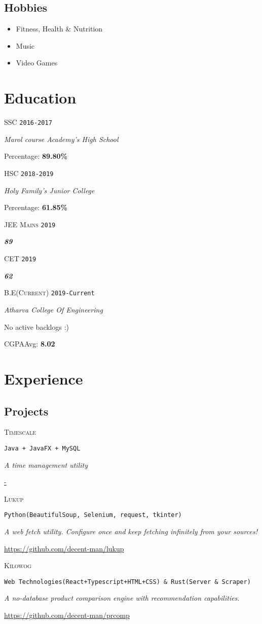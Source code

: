 \documentclass{article}
\newcommand{\school}{Marol course Academy's High School}
\newcommand{\hischool}{Holy Family's Junior College}
\newcommand{\college}{Atharva College Of Engineering}
\newcommand{\course}[6]{
	\begin{minipage}[t]{.15\textwidth}
		\hfill \large \textsc{#1}\hspace{1cm}\linebreak[4]
		\vspace{1cm}
		\hfill \footnotesize \texttt{#2}
	\end{minipage}
	\hfill\vline\hfill
	\begin{minipage}[t]{.80\textwidth}
		\large \textsl{#3}

		#6
		
		#4: \textbf{#5}
	\end{minipage}
}
\newcommand{\currentsep}{
	\begin{center}
		\dotfill
	\end{center}
}
\newcommand{\entrance}[3]{
	\begin{minipage}[t]{.15\textwidth}
		\hfill \large \textsc{#1}\hspace{1cm}\linebreak[4]
		\vspace{1cm}
		\hfill \footnotesize \texttt{#2}
	\end{minipage}
	\hfill\vline\hfill
	\begin{minipage}[t]{.80\textwidth}
		\textsl{\textbf{#3}}
	\end{minipage}
}
\newcommand{\project}[4]{
	\begin{minipage}[t]{.15\textwidth}
		\hfill \textsc{#1}
	\end{minipage}
	\hfill\vline\hfill
	\begin{minipage}[t]{.80\textwidth}

		\texttt{#2}

		\textsl{#3}

		\url{#4}

		\dotfill
	\end{minipage}
}
\begin{document}
		\subsection{Hobbies}
			\begin{itemize}
				\item Fitness, Health \& Nutrition
				\item Music
				\item Video Games
			\end{itemize}
	\section{Education}
		\course{SSC}
			{2016-2017} 
			{\school}
			{Percentage}
			{89.80\%}
			{}
		\course{HSC}
			{2018-2019} 
			{\hischool}
			{Percentage}
			{61.85\%}
			{}
		\entrance{JEE Mains}{2019}{89}
		\entrance{CET}{2019}{62}
		\currentsep
		\course{B.E\scriptsize(Current)}
			{2019-Current}
			{\college}
			{CGPA\scriptsize Avg\large}
			{8.02}
			{No active backlogs :)}
		\currentsep
	\section{Experience}
		\subsection{Projects}
				\project{Timescale}
				{Java + JavaFX + MySQL}
				{A time management utility}
				{-}
				\project{Lukup}
				{Python(BeautifulSoup, Selenium, request, tkinter)}
				{A web fetch utility. \footnotesize Configure once and keep fetching infinitely from your sources!}
				{https://github.com/decent-man/lukup}
				\project{Kilowog}
				{Web Technologies(React+Typescript+HTML+CSS) \& Rust(Server \& Scraper)}
				{A no-database product comparison engine with recommendation capabilities.}
				{https://github.com/decent-man/prcomp}
\end{document}
